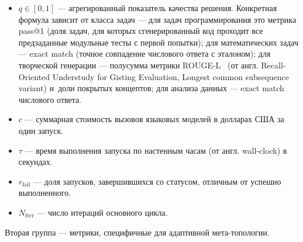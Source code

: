 \begin{itemize}[noitemsep]
  \item $q \in [0, 1]$ --- агрегированный показатель качества
        решения. Конкретная формула зависит от класса задач ---
        для задач программирования это метрика pass@1 (доля
        задач, для которых сгенерированный код проходит все
        предзаданные модульные тесты с первой попытки); для
        математических задач --- exact match (точное совпадение
        числового ответа с эталоном); для творческой генерации ---
        полусумма метрики ROUGE-L~\cite{rouge2004} (от англ.
        Recall-Oriented Understudy for Gisting Evaluation, Longest
        common subsequence variant) и~доли покрытых концептов; для
        анализа данных --- exact match числового ответа.
  \item $c$ --- суммарная стоимость вызовов языковых моделей
        в долларах США за один запуск.
  \item $\tau$ --- время выполнения запуска по настенным часам
        (от англ. wall-clock) в секундах.
  \item $r_{\text{fail}}$ --- доля запусков, завершившихся со
        статусом, отличным от успешно выполненного.
  \item $N_{\text{iter}}$ --- число итераций основного цикла.
\end{itemize}

Вторая группа --- метрики, специфичные для адаптивной мета-топологии.

